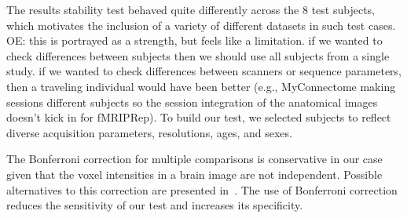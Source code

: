 \documentclass[lettersize,journal]{IEEEtran}
\newcommand{\oesteban}[1]{\color{orange}\textsc{OE:} #1\color{black}\xspace}
\begin{document}
The results stability test behaved quite differently across the 8 test subjects, which motivates the inclusion
of a variety of different datasets in such test cases.
\oesteban{this is portrayed as a strength, but feels like a limitation. if we wanted to check differences between subjects then we should use all subjects from a single study. if we wanted to check differences between scanners or sequence parameters, then a traveling individual would have been better (e.g., MyConnectome making sessions different subjects so the session integration of the anatomical images doesn't kick in for fMRIPRep).}
To build our test, we selected subjects to reflect diverse acquisition parameters, resolutions, ages, and sexes.


The Bonferroni correction for multiple comparisons is conservative in our case given that the voxel intensities in a brain image are not independent.
Possible alternatives to this correction are presented in~\cite{NICHOLS2007246}. The use of Bonferroni correction reduces the sensitivity of our test
and increases its specificity.


\end{document}
